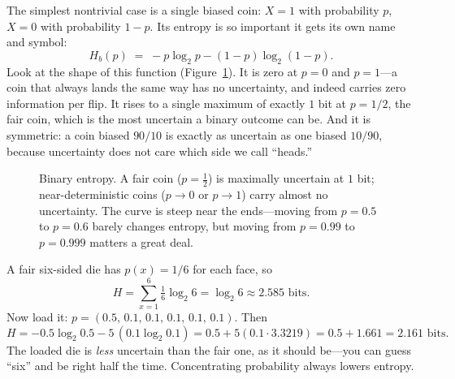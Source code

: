 The simplest nontrivial case is a single biased coin: $X = 1$ with probability $p$, $X = 0$ with
probability $1-p$. Its entropy is so important it gets its own name and symbol:
\[
  H_b(p) \;=\; -p\log_2 p - (1-p)\log_2(1-p).
\]
Look at the shape of this function (Figure~\ref{ch33:fig-binary-entropy}). It is zero at $p = 0$ and
$p = 1$---a coin that always lands the same way has no uncertainty, and indeed carries zero information
per flip. It rises to a single maximum of exactly $1$ bit at $p = 1/2$, the fair coin, which is the most
uncertain a binary outcome can be. And it is symmetric: a coin biased $90/10$ is exactly as uncertain as
one biased $10/90$, because uncertainty does not care which side we call ``heads.''

\begin{figure}[H]
\centering
{}
\caption{Binary entropy. A fair coin ($p=\tfrac12$) is maximally uncertain at $1$ bit; near-deterministic
coins ($p\to 0$ or $p\to 1$) carry almost no uncertainty. The curve is steep near the ends---moving from
$p=0.5$ to $p=0.6$ barely changes entropy, but moving from $p=0.99$ to $p=0.999$ matters a great deal.}
\label{ch33:fig-binary-entropy}
\end{figure}

\begin{example}
\label{ch33:fair-loaded-die}
A fair six-sided die has $p(x) = 1/6$ for each face, so
\[
  H = \sum_{x=1}^{6} \tfrac16 \log_2 6 = \log_2 6 \approx 2.585 \text{ bits}.
\]
Now load it: $p = (0.5,\,0.1,\,0.1,\,0.1,\,0.1,\,0.1)$. Then
\[
  H = -0.5\log_2 0.5 - 5\,(0.1\log_2 0.1)
    = 0.5 + 5(0.1 \cdot 3.3219)
    = 0.5 + 1.661 = 2.161 \text{ bits}.
\]
The loaded die is \emph{less} uncertain than the fair one, as it should be---you can guess ``six'' and be
right half the time. Concentrating probability always lowers entropy.
\end{example}

